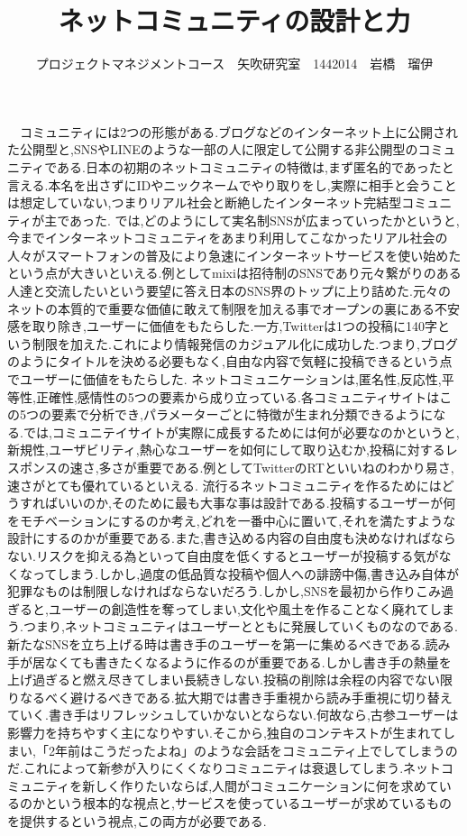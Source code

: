 \documentclass[uplatex,twocolumn,dvipdfmx]{jsarticle}
\title{\vspace{-5mm}\fontsize{14pt}{0pt}\selectfont ネットコミュニティの設計と力}
\author{\normalsize プロジェクトマネジメントコース　矢吹研究室　1442014　岩橋　瑠伊}
\date{}
\begin{document}
\fontsize{10.5pt}{\baselineskip}\selectfont
\maketitle





　コミュニティには2つの形態がある.ブログなどのインターネット上に公開された公開型と,SNSやLINEのような一部の人に限定して公開する非公開型のコミュニティである.日本の初期のネットコミュニティの特徴は,まず匿名的であったと言える.本名を出さずにIDやニックネームでやり取りをし,実際に相手と会うことは想定していない,つまりリアル社会と断絶したインターネット完結型コミュニティが主であった.
では,どのようにして実名制SNSが広まっていったかというと,今までインターネットコミュニティをあまり利用してこなかったリアル社会の人々がスマートフォンの普及により急速にインターネットサービスを使い始めたという点が大きいといえる.例としてmixiは招待制のSNSであり元々繋がりのある人達と交流したいという要望に答え日本のSNS界のトップに上り詰めた.元々のネットの本質的で重要な価値に敢えて制限を加える事でオープンの裏にある不安感を取り除き,ユーザーに価値をもたらした.一方,Twitterは1つの投稿に140字という制限を加えた.これにより情報発信のカジュアル化に成功した.つまり,ブログのようにタイトルを決める必要もなく,自由な内容で気軽に投稿できるという点でユーザーに価値をもたらした.
ネットコミュニケーションは,匿名性,反応性,平等性,正確性,感情性の5つの要素から成り立っている.各コミュニティサイトはこの5つの要素で分析でき,パラメーターごとに特徴が生まれ分類できるようになる.では,コミュニテイサイトが実際に成長するためには何が必要なのかというと,新規性,ユーザビリティ,熱心なユーザーを如何にして取り込むか,投稿に対するレスポンスの速さ,多さが重要である.例としてTwitterのRTといいねのわかり易さ,速さがとても優れているといえる.
流行るネットコミュニティを作るためにはどうすればいいのか,そのために最も大事な事は設計である.投稿するユーザーが何をモチベーションにするのか考え,どれを一番中心に置いて,それを満たすような設計にするのかが重要である.また,書き込める内容の自由度も決めなければならない.リスクを抑える為といって自由度を低くするとユーザーが投稿する気がなくなってしまう.しかし,過度の低品質な投稿や個人への誹謗中傷,書き込み自体が犯罪なものは制限しなければならないだろう.しかし,SNSを最初から作りこみ過ぎると,ユーザーの創造性を奪ってしまい,文化や風土を作ることなく廃れてしまう.つまり,ネットコミュニティはユーザーとともに発展していくものなのである.
新たなSNSを立ち上げる時は書き手のユーザーを第一に集めるべきである.読み手が居なくても書きたくなるように作るのが重要である.しかし書き手の熱量を上げ過ぎると燃え尽きてしまい長続きしない.投稿の削除は余程の内容でない限りなるべく避けるべきである.拡大期では書き手重視から読み手重視に切り替えていく.書き手はリフレッシュしていかないとならない.何故なら,古参ユーザーは影響力を持ちやすく主になりやすい.そこから,独自のコンテキストが生まれてしまい,「2年前はこうだったよね」のような会話をコミュニティ上でしてしまうのだ.これによって新参が入りにくくなりコミュニティは衰退してしまう.ネットコミュニティを新しく作りたいならば,人間がコミュニケーションに何を求めているのかという根本的な視点と,サービスを使っているユーザーが求めているものを提供するという視点,この両方が必要である.
\end{document}
